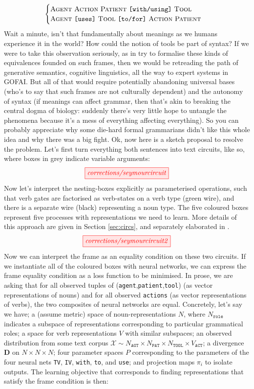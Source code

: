 \[\begin{cases}
\textsc{Agent} \ \textsc{Action} \ \textsc{Patient} \ \texttt{[with/using]} \ \textsc{Tool}\\ \textsc{Agent} \ \texttt{[uses]} \ \textsc{Tool} \ \texttt{[to/for]} \ \textsc{Action} \ \textsc{Patient}
\end{cases}\]
Wait a minute, isn't that fundamentally about meanings as we humans experience it in the world? How could the notion of tools be part of syntax? If we were to take this observation seriously, as in try to formalise these kinds of equivalences founded on such frames, then we would be retreading the path of generative semantics, cognitive linguistics, all the way to expert systems in GOFAI. But all of that would require potentially abandoning universal bases (who's to say that such frames are not culturally dependent) and the autonomy of syntax (if meanings can affect grammar, then that's akin to breaking the central dogma of biology: suddenly there's very little hope to untangle the phenomena because it's a mess of everything affecting everything). So you can probably appreciate why some die-hard formal grammarians didn't like this whole idea and why there was a big fight. Ok, now here is a sketch proposal to resolve the problem. Let's first turn everything both sentences into text circuits, like so, where boxes in grey indicate variable arguments:
\[\tikzfig{corrections/seymourcircuit}\]
Now let's interpret the nesting-boxes explicitly as parameterised operations, such that verb gates are factorised as verb-states on a verb type (green wire), and there is a separate wire (black) representing a noun type. The five coloured boxes represent five processes with representations we need to learn. More details of this approach are given in Section \ref{sec:circs}, and separately elaborated in \citep{rodatzPatternLanguageMachine2024}.
\[\tikzfig{corrections/seymourcircuit2}\]
Now we can interpret the frame as an equality condition on these two circuits. If we instantiate all of the coloured boxes with neural networks, we can express the frame equality condition as a loss function to be minimised. In prose, we are asking that for all observed tuples of (\texttt{agent},\texttt{patient},\texttt{tool}) (as vector representations of nouns) and for all observed \texttt{actions} (as vector representations of verbs), the two composites of neural networks are equal. Concretely, let's say we have; a (assume metric) space of noun-representations $N$, where $N_\texttt{role}$ indicates a subspace of representations corresponding to particular grammatical roles; a space for verb representations $V$ with similar subspaces; an observed distribution from some text corpus $\mathcal{X} \sim N_\texttt{AGT} \times N_\texttt{PAT} \times N_\texttt{TOOL} \times V_\texttt{ACT}$; a divergence $\mathbf{D}$ on $N \times N \times N$; four parameter spaces $P$ corresponding to the parameters of the four neural nets \texttt{TV}, \texttt{IV}, \texttt{with}, \texttt{to}, and \texttt{use}; and projection maps $\pi_i$ to isolate outputs. The learning objective that corresponds to finding representations that satisfy the frame condition is then:
